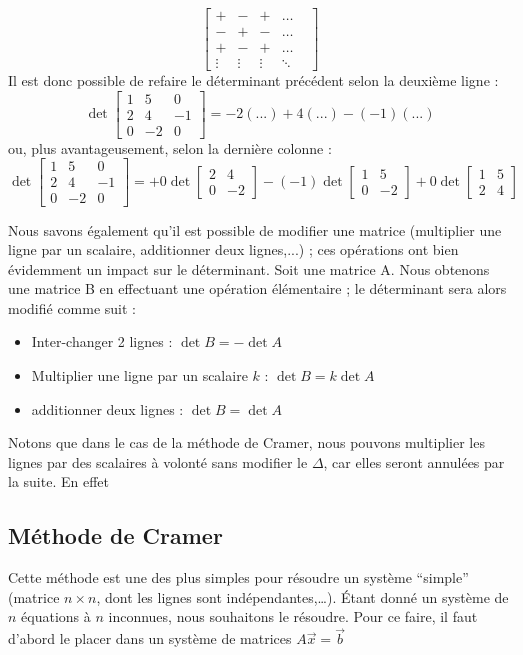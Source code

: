 \documentclass[12pt,a4paper]{article}
\begin{document}
\[\begin{bmatrix}
 + & - & + & \ldots & \\
 - & + & - & \ldots &\\
 + & - & + & \ldots &\\
 \vdots & \vdots & \vdots  & \ddots
\end{bmatrix}\]
Il est donc possible de refaire le déterminant précédent selon la deuxième ligne :
\[\det \begin{bmatrix}
	1 & 5 & 0\\
	2 & 4 & -1\\
	0 & -2 & 0
\end{bmatrix} = -2(...) + 4(...) -(-1)(...)\]
ou, plus avantageusement, selon la dernière colonne :
\[\det \begin{bmatrix}
	1 & 5 & 0\\
	2 & 4 & -1\\
	0 & -2 & 0
\end{bmatrix} = +0 \det\begin{bmatrix}
2 & 4\\
0 & -2
\end{bmatrix} -(-1)\det\begin{bmatrix}
1 & 5\\
0 & -2
\end{bmatrix} + 0\det\begin{bmatrix}
1 & 5\\
2 & 4
\end{bmatrix}
\]

Nous savons également qu'il est possible de modifier une matrice (multiplier une ligne par un scalaire, additionner deux lignes,...) ; ces opérations ont bien évidemment un impact sur le déterminant. Soit une matrice A. Nous obtenons une matrice B en effectuant une opération élémentaire ; le déterminant sera alors modifié comme suit :
\begin{itemize}
	\item 	Inter-changer 2 lignes : $\det B = - \det A$
	\item 	Multiplier une ligne par un scalaire $k$ : $\det B = k\det A$
	\item 	additionner deux lignes : $\det B = \det A$
\end{itemize}
Notons que dans le cas de la méthode de Cramer, nous pouvons multiplier les lignes par des scalaires à volonté sans modifier le $\Delta$, car elles seront annulées par la suite. En effet
\subsection{Méthode de Cramer}
\label{app: methode de cramer}
Cette méthode est une des plus simples pour résoudre un système ``simple'' (matrice $n\times n$, dont les lignes sont indépendantes,\ldots). Étant donné un système de $n$ équations à $n$ inconnues, nous souhaitons le résoudre. Pour ce faire, il faut d'abord le placer dans un système de matrices $A\vec{x} = \vec{b}$
\end{document}
